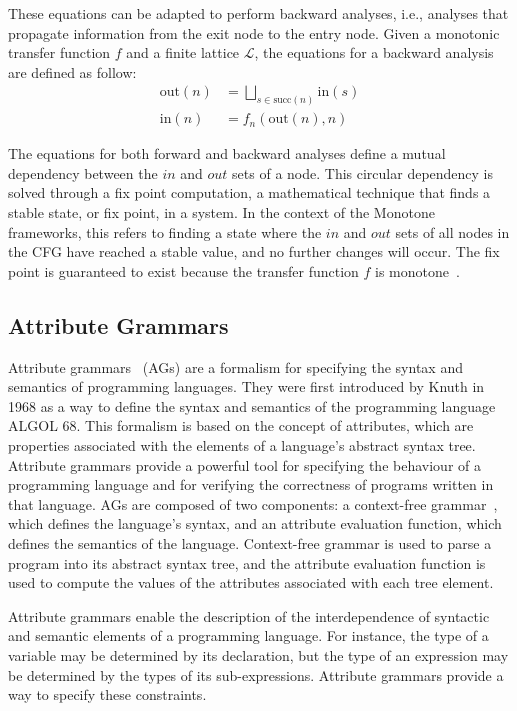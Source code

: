 These equations can be adapted to perform backward analyses, i.e., analyses that
propagate information from the exit node to the entry node. 
Given a monotonic transfer function $f$ and a finite lattice $\mathcal{L}$, the equations for 
a backward analysis are defined as follow:
\begin{align*}
  \text{out}(n) &= \bigsqcup\limits_{s \in \text{succ}(n)} \text{in}(s) \\
  \text{in}(n) &= f_n(\text{out}(n),n)
\end{align*}

The equations for both forward and backward analyses define a mutual dependency 
between the $in$ and $out$ sets of a node. 
This circular dependency is solved through a fix point computation,
a mathematical technique that finds a stable state, or fix point, in a system.
In the context of the Monotone frameworks, this
refers to finding a state where the $in$ and $out$ sets of all nodes in the CFG have reached a
stable value, and no further changes will occur. The fix point is guaranteed to exist
because the transfer function $f$ is monotone~\cite{Knaster1929}.



\subsection{Attribute Grammars}
\label{chap:attr-grammars}
Attribute grammars~\cite{knuth1968semantics} (AGs) are a formalism for specifying
the syntax and semantics of programming languages.
They were first introduced by Knuth in 1968 as a way to define the syntax and semantics of the programming
language ALGOL 68. This formalism is based on the concept of attributes,
which are properties associated with the elements of a language's abstract syntax tree.
Attribute grammars provide a powerful tool for specifying the behaviour of a programming
language and for verifying the correctness of programs written in that language.
%
AGs are composed of two components: a context-free grammar~\cite{CREMERS197586},
which defines the language's syntax, and an attribute evaluation function,
which defines the semantics of the language. Context-free grammar is used to
parse a program into its abstract syntax tree, and the attribute evaluation function
is used to compute the values of the attributes associated with each tree element.

Attribute grammars enable the description of the
interdependence of syntactic and semantic elements of a programming language.
For instance, the type of a variable may be determined by its declaration,
but the type of an expression may be determined by the types of its sub-expressions.
Attribute grammars provide a way to specify these constraints.

